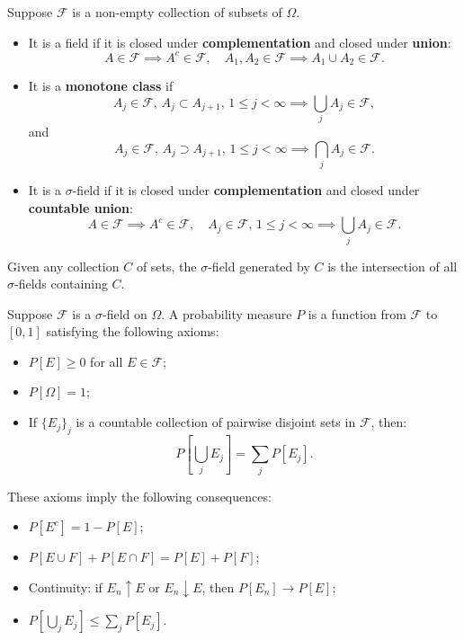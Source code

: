 \begin{defn}
    Suppose \(\mathcal{F}\) is a non-empty collection of subsets of \(\Omega\).
    \begin{itemize}
        \item It is a field if it is closed under \textbf{complementation} and closed under \textbf{union}:
        \[
        A \in \mathcal{F} \implies A^c \in \mathcal{F}, \quad A_1, A_2 \in \mathcal{F} \implies A_1 \cup A_2 \in \mathcal{F}.
        \]
        \item It is a \textbf{monotone class} if
        \[
        A_j \in \mathcal{F}, \, A_j \subset A_{j+1}, \, 1 \leq j < \infty \implies \bigcup_j A_j \in \mathcal{F},
        \]
        and
        \[
        A_j \in \mathcal{F}, \, A_j \supset A_{j+1}, \, 1 \leq j < \infty \implies \bigcap_j A_j \in \mathcal{F}.
        \]
        \item It is a \(\sigma\)-field if it is closed under \textbf{complementation} and closed under \textbf{countable union}:
        \[
        A \in \mathcal{F} \implies A^c \in \mathcal{F}, \quad A_j \in \mathcal{F}, \, 1 \leq j < \infty \implies \bigcup_j A_j \in \mathcal{F}.
        \]
    \end{itemize}
\end{defn}

\begin{defn}
Given any collection \( C \) of sets, the \(\sigma\)-field generated by \( C \) is the intersection of all \(\sigma\)-fields containing \( C \).
\end{defn}

\begin{defn}
    Suppose \(\mathcal{F}\) is a \(\sigma\)-field on \(\Omega\). A probability measure \(P\) is a function from \(\mathcal{F}\) to \([0, 1]\) satisfying the following axioms:
    \begin{itemize}
        \item \(P[E] \geq 0\) for all \(E \in \mathcal{F}\);
        \item \(P[\Omega] = 1\);
        \item If \(\{E_j\}_{j}\) is a countable collection of pairwise disjoint sets in \(\mathcal{F}\), then:
        \[
        P\left[\bigcup_j E_j\right] = \sum_j P[E_j].
        \]
    \end{itemize}
    These axioms imply the following consequences:
    \begin{itemize}
        \item \(P[E^c] = 1 - P[E]\);
        \item \(P[E \cup F] + P[E \cap F] = P[E] + P[F]\);
        \item Continuity: if \(E_n \uparrow E\) or \(E_n \downarrow E\), then \(P[E_n] \to P[E]\);
        \item \(P\left[\bigcup_j E_j\right] \leq \sum_j P[E_j]\).
    \end{itemize}
\end{defn}

